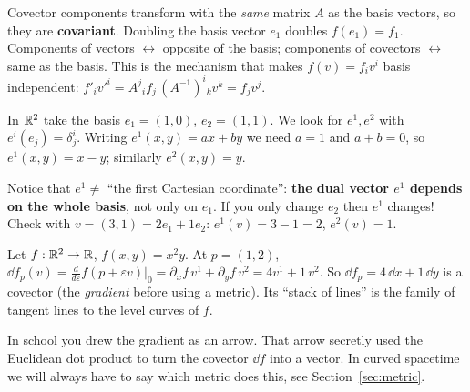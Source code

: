 \begin{intuition}[{covariant = changes like the basis}]
Covector components transform with the \emph{same} matrix $A$ as the basis vectors, so they are \textbf{covariant}. Doubling the basis vector $e_1$ doubles $f(e_1)=f_1$. Components of vectors $\leftrightarrow$ opposite of the basis; components of covectors $\leftrightarrow$ same as the basis. This is the mechanism that makes $f(v)=f_iv^i$ basis independent:
$f'_iv'^i=A^j{}_if_j\,(A^{-1})^i{}_kv^k=f_jv^j$.
\end{intuition}

\begin{example}
In $\mathbb{R}^2$ take the basis $e_1=(1,0)$, $e_2=(1,1)$. We look for $e^{1},e^{2}$ with $e^{i}(e_j)=\delta^i_j$. Writing $e^{1}(x,y)=ax+by$ we need $a=1$ and $a+b=0$, so $e^{1}(x,y)=x-y$; similarly $e^{2}(x,y)=y$.

Notice that $e^{1}\neq$ ``the first Cartesian coordinate'': \textbf{the dual vector $e^{1}$ depends on the whole basis}, not only on $e_1$. If you only change $e_2$ then $e^{1}$ changes! Check with $v=(3,1)=2e_1+1e_2$: $e^{1}(v)=3-1=2$, $e^{2}(v)=1$. \checkmark
\end{example}

\begin{example}
Let $f:\mathbb{R}^2\to\mathbb{R}$, $f(x,y)=x^2y$. At $p=(1,2)$, $\dd f_p(v)=\frac{d}{d\varepsilon}f(p+\varepsilon v)|_0=\partial_xf\,v^1+\partial_yf\,v^2=4v^1+1\,v^2$. So $\dd f_p=4\,\dd x+1\,\dd y$ is a covector (the \emph{gradient} before using a metric). Its ``stack of lines'' is the family of tangent lines to the level curves of $f$.
\end{example}

\begin{pitfall}
In school you drew the gradient as an arrow. That arrow secretly used the Euclidean dot product to turn the covector $\dd f$ into a vector. In curved spacetime we will always have to say which metric does this, see Section~\ref{sec:metric}.
\end{pitfall}
